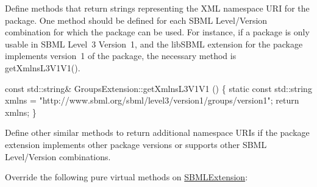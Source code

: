 Define methods that return strings representing the X\+ML namespace U\+RI for the package. One method should be defined for each S\+B\+ML Level/\+Version combination for which the package can be used. For instance, if a package is only usable in S\+B\+ML Level~3 Version~1, and the lib\+S\+B\+ML extension for the package implements version~1 of the package, the necessary method is {\ttfamily get\+Xmlns\+L3\+V1\+V1()}. 
\begin{DoxyCode}
\textcolor{keyword}{const} std::string& GroupsExtension::getXmlnsL3V1V1 ()
\{
      \textcolor{keyword}{static} \textcolor{keyword}{const} std::string xmlns = \textcolor{stringliteral}{"http://www.sbml.org/sbml/level3/version1/groups/version1"};
      \textcolor{keywordflow}{return} xmlns;
\}
\end{DoxyCode}


Define other similar methods to return additional namespace U\+R\+Is if the package extension implements other package versions or supports other S\+B\+ML Level/\+Version combinations.

Override the following pure virtual methods on \hyperlink{class_s_b_m_l_extension}{S\+B\+M\+L\+Extension}\+:

